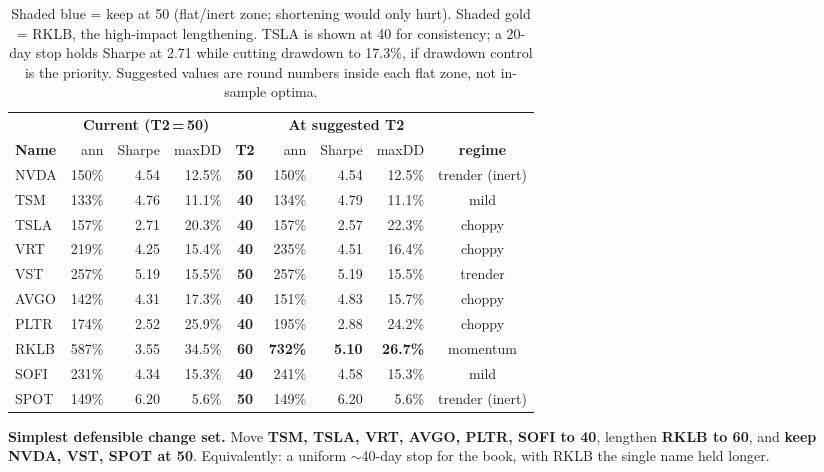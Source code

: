 \documentclass[11pt]{article}
\begin{document}
\begin{table}[h]\centering\small
\renewcommand{\arraystretch}{1.25}
\begin{tabular}{l r r r c r r r c}
\toprule
& \multicolumn{3}{c}{\textbf{Current (T2\,=\,50)}} & & \multicolumn{3}{c}{\textbf{At suggested T2}} & \\
\cmidrule(lr){2-4}\cmidrule(lr){6-8}
\textbf{Name} & ann & Sharpe & maxDD & \textbf{T2} & ann & Sharpe & maxDD & \textbf{regime}\\
\midrule
\rowcolor{bckeep} NVDA & 150\% & 4.54 & 12.5\% & \textbf{50} & 150\% & 4.54 & 12.5\% & trender (inert)\\
TSM  & 133\% & 4.76 & 11.1\% & \textbf{40} & 134\% & 4.79 & 11.1\% & mild\\
TSLA & 157\% & 2.71 & 20.3\% & \textbf{40} & 157\% & 2.57 & 22.3\% & choppy\\
VRT  & 219\% & 4.25 & 15.4\% & \textbf{40} & 235\% & 4.51 & 16.4\% & choppy\\
\rowcolor{bckeep} VST  & 257\% & 5.19 & 15.5\% & \textbf{50} & 257\% & 5.19 & 15.5\% & trender\\
AVGO & 142\% & 4.31 & 17.3\% & \textbf{40} & 151\% & 4.83 & 15.7\% & choppy\\
PLTR & 174\% & 2.52 & 25.9\% & \textbf{40} & 195\% & 2.88 & 24.2\% & choppy\\
\rowcolor{bcact} RKLB & 587\% & 3.55 & 34.5\% & \textbf{60} & \textbf{732\%} & \textbf{5.10} & \textbf{26.7\%} & momentum\\
SOFI & 231\% & 4.34 & 15.3\% & \textbf{40} & 241\% & 4.58 & 15.3\% & mild\\
\rowcolor{bckeep} SPOT & 149\% & 6.20 & 5.6\% & \textbf{50} & 149\% & 6.20 & 5.6\% & trender (inert)\\
\bottomrule
\end{tabular}
\caption*{\footnotesize Shaded blue = keep at 50 (flat/inert zone; shortening would only hurt).
Shaded gold = RKLB, the high-impact lengthening. TSLA is shown at 40 for consistency; a 20-day
stop holds Sharpe at 2.71 while cutting drawdown to 17.3\%, if drawdown control is the priority.
Suggested values are round numbers inside each flat zone, not in-sample optima.}
\end{table}

\textbf{Simplest defensible change set.} Move \textbf{TSM, TSLA, VRT, AVGO, PLTR, SOFI to 40},
lengthen \textbf{RKLB to 60}, and \textbf{keep NVDA, VST, SPOT at 50}. Equivalently: a uniform
$\sim$40-day stop for the book, with RKLB the single name held longer.
\end{document}
